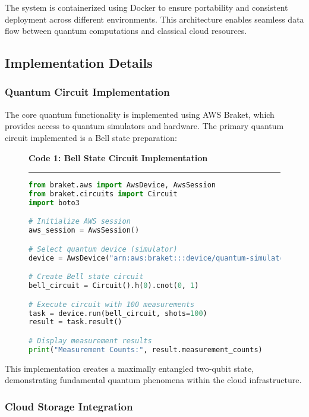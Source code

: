 \documentclass[conference]{IEEEtran}
\begin{document}
The system is containerized using Docker to ensure portability and consistent deployment across different environments. This architecture enables seamless data flow between quantum computations and classical cloud resources.

\subsection{Implementation Details}

\subsubsection{Quantum Circuit Implementation}

The core quantum functionality is implemented using AWS Braket, which provides access to quantum simulators and hardware. The primary quantum circuit implemented is a Bell state preparation:

\begin{figure}[h]
\centering
\setlength{\fboxsep}{8pt}
\textbf{Code 1: Bell State Circuit Implementation}
\vspace{3pt}
\hrule
\vspace{3pt}
\begin{lstlisting}[language=Python, basicstyle=\ttfamily\scriptsize, breaklines=true]
from braket.aws import AwsDevice, AwsSession
from braket.circuits import Circuit
import boto3

# Initialize AWS session
aws_session = AwsSession()

# Select quantum device (simulator)
device = AwsDevice("arn:aws:braket:::device/quantum-simulator/amazon/sv1")

# Create Bell state circuit
bell_circuit = Circuit().h(0).cnot(0, 1)

# Execute circuit with 100 measurements
task = device.run(bell_circuit, shots=100)
result = task.result()

# Display measurement results
print("Measurement Counts:", result.measurement_counts)
\end{lstlisting}
\end{figure}

This implementation creates a maximally entangled two-qubit state, demonstrating fundamental quantum phenomena within the cloud infrastructure.

\subsubsection{Cloud Storage Integration}
\end{document}
